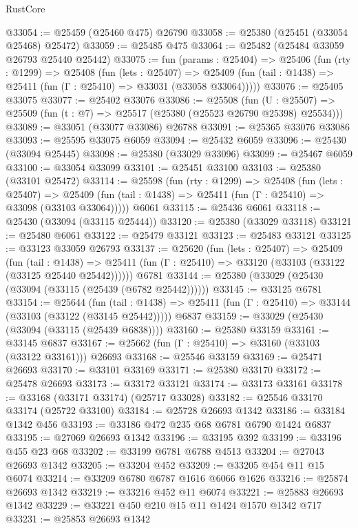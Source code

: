 \begin{lexlean}{RustCore}
\begin{coremodule}
@33054 := @25459 (@25460 @475) @26790
@33058 := @25380 (@25451 (@33054 @25468) @25472)
@33059 := @25485 @475
@33064 := @25482 (@25484 @33059 @26793 @25440 @25442)
@33075 := fun (params : @25404) =>
  @25406
    (fun (rty : @1299) =>
    @25408
      (fun (lets : @25407) =>
      @25409 (fun (tail : @1438) => @25411 (fun (Γ : @25410) => @33031 (@33058 @33064)))))
@33076 := @25405 @33075
@33077 := @25402 @33076
@33086 := @25508
    (fun (U : @25507) => @25509 (fun (t : @7) => @25517 (@25380 (@25523 @26790 @25398) @25534)))
@33089 := @33051 (@33077 @33086) @26788
@33091 := @25365 @33076 @33086
@33093 := @25595 @33075 @6059
@33094 := @25432 @6059
@33096 := @25430 (@33094 @25445)
@33098 := @25380 (@33029 @33096)
@33099 := @25467 @6059
@33100 := @33054 @33099
@33101 := @25451 @33100
@33103 := @25380 (@33101 @25472)
@33114 := @25598
    (fun (rty : @1299) =>
    @25408
      (fun (lets : @25407) =>
      @25409 (fun (tail : @1438) => @25411 (fun (Γ : @25410) => @33098 (@33103 @33064)))))
    @6061
@33115 := @25436 @6061
@33118 := @25430 (@33094 (@33115 @25444))
@33120 := @25380 (@33029 @33118)
@33121 := @25480 @6061
@33122 := @25479 @33121
@33123 := @25483 @33121
@33125 := @33123 @33059 @26793
@33137 := @25620
    (fun (lets : @25407) =>
    @25409
      (fun (tail : @1438) =>
      @25411 (fun (Γ : @25410) => @33120 (@33103 (@33122 (@33125 @25440 @25442))))))
    @6781
@33144 := @25380 (@33029 (@25430 (@33094 (@33115 (@25439 (@6782 @25442))))))
@33145 := @33125 @6781
@33154 := @25644
    (fun (tail : @1438) => @25411 (fun (Γ : @25410) => @33144 (@33103 (@33122 (@33145 @25442)))))
    @6837
@33159 := @33029 (@25430 (@33094 (@33115 (@25439 @6838))))
@33160 := @25380 @33159
@33161 := @33145 @6837
@33167 := @25662 (fun (Γ : @25410) => @33160 (@33103 (@33122 @33161))) @26693
@33168 := @25546 @33159
@33169 := @25471 @26693
@33170 := @33101 @33169
@33171 := @25380 @33170
@33172 := @25478 @26693
@33173 := @33172 @33121
@33174 := @33173 @33161
@33178 := @33168 (@33171 @33174) (@25717 @33028)
@33182 := @25546 @33170 @33174 (@25722 @33100)
@33184 := @25728 @26693 @1342
@33186 := @33184 @1342 @456
@33193 := @33186 @472 @235 @68 @6781 @6790 @1424 @6837
@33195 := @27069 @26693 @1342
@33196 := @33195 @392
@33199 := @33196 @455 @23 @68
@33202 := @33199 @6781 @6788 @4513
@33204 := @27043 @26693 @1342
@33205 := @33204 @452
@33209 := @33205 @454 @11 @15 @6074
@33214 := @33209 @6780 @6787 @1616 @6066 @1626
@33216 := @25874 @26693 @1342
@33219 := @33216 @452 @11 @6074
@33221 := @25883 @26693 @1342
@33229 := @33221 @450 @210 @15 @11 @1424 @1570 @1342 @717
@33231 := @25853 @26693 @1342

\end{coremodule}
\end{lexlean}
